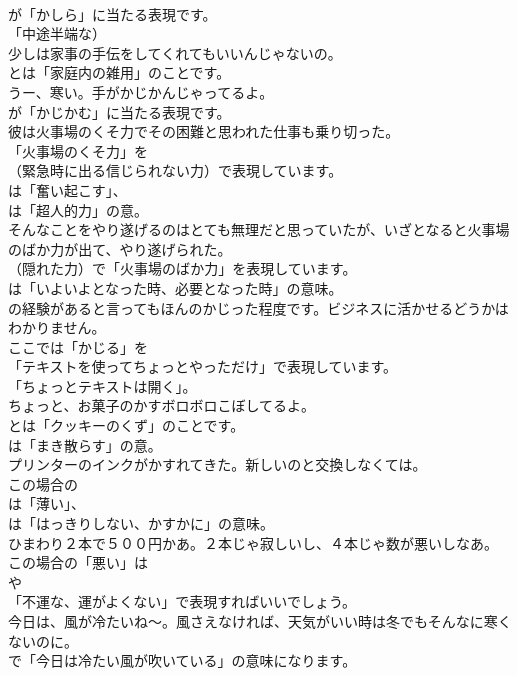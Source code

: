 \documentclass[8pt]{extreport}
\begin{document}
\begin{CJK}{UTF8}{min}
\\	が「かしら」に当たる表現です。
\\	「中途半端な）	
\\	少しは家事の手伝をしてくれてもいいんじゃないの。 
\\	とは「家庭内の雑用」のことです。	
\\	うー、寒い。手がかじかんじゃってるよ。 
\\	が「かじかむ」に当たる表現です。	
\\	彼は火事場のくそ力でその困難と思われた仕事も乗り切った。 
\\	「火事場のくそ力」を 
\\	（緊急時に出る信じられない力）で表現しています。
\\	は「奮い起こす」、
\\	は「超人的力」の意。	
\\	そんなことをやり遂げるのはとても無理だと思っていたが、いざとなると火事場のばか力が出て、やり遂げられた。 
\\	（隠れた力）で「火事場のばか力」を表現しています。
\\	は「いよいよとなった時、必要となった時」の意味。	
\\	の経験があると言ってもほんのかじった程度です。ビジネスに活かせるどうかはわかりません。 
\\	ここでは「かじる」を
\\	「テキストを使ってちょっとやっただけ」で表現しています。
\\	「ちょっとテキストは開く」。	
\\	ちょっと、お菓子のかすボロボロこぼしてるよ。 
\\	とは「クッキーのくず」のことです。
\\	は「まき散らす」の意。	
\\	プリンターのインクがかすれてきた。新しいのと交換しなくては。 
\\	この場合の 
\\	は「薄い」、
\\	は「はっきりしない、かすかに」の意味。	
\\	ひまわり２本で５００円かあ。２本じゃ寂しいし、４本じゃ数が悪いしなあ。 
\\	この場合の「悪い」は
\\	や
\\	「不運な、運がよくない」で表現すればいいでしょう。	
\\	今日は、風が冷たいね～。風さえなければ、天気がいい時は冬でもそんなに寒くないのに。 
\\	で「今日は冷たい風が吹いている」の意味になります。

\end{CJK}
\end{document}
